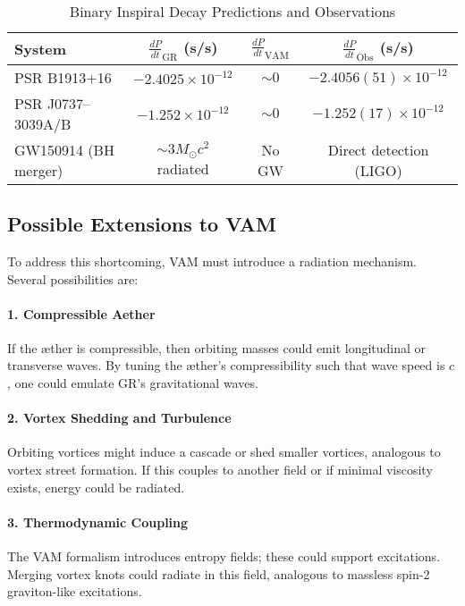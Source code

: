 \begin{table}[h!]
    \centering
    \caption{Binary Inspiral Decay Predictions and Observations}
    \label{tab:gw_comparison}
    \begin{tabular}{lccc}
        \toprule
        System & $\frac{dP}{dt}_{\text{GR}}$ (s/s) & $\frac{dP}{dt}_{\text{VAM}}$ & $\frac{dP}{dt}_{\text{Obs}}$ (s/s) \\
        \midrule
        PSR B1913+16 & $-2.4025\times10^{-12}$ & $\sim 0$ & $-2.4056(51)\times10^{-12}$ \\
        PSR J0737--3039A/B & $-1.252\times10^{-12}$ & $\sim 0$ & $-1.252(17)\times10^{-12}$ \\
        GW150914 (BH merger) & $\sim 3M_\odot c^2$ radiated & No GW & Direct detection (LIGO) \\
        \bottomrule
    \end{tabular}
\end{table}

\subsection*{Possible Extensions to VAM}

To address this shortcoming, VAM must introduce a radiation mechanism. Several possibilities are:

\paragraph{1. Compressible Aether} If the \ae ther is compressible, then orbiting masses could emit longitudinal or transverse waves. By tuning the \ae ther's compressibility such that wave speed is $c$, one could emulate GR's gravitational waves.

\paragraph{2. Vortex Shedding and Turbulence} Orbiting vortices might induce a cascade or shed smaller vortices, analogous to vortex street formation. If this couples to another field or if minimal viscosity exists, energy could be radiated.

\paragraph{3. Thermodynamic Coupling} The VAM formalism introduces entropy fields; these could support excitations. Merging vortex knots could radiate in this field, analogous to massless spin-2 graviton-like excitations.

